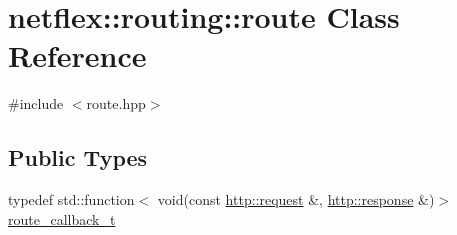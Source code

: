 \hypertarget{classnetflex_1_1routing_1_1route}{}\section{netflex\+:\+:routing\+:\+:route Class Reference}
\label{classnetflex_1_1routing_1_1route}


{\ttfamily \#include $<$route.\+hpp$>$}

\subsection*{Public Types}
\begin{DoxyCompactItemize}
\item 
typedef std\+::function$<$ void(const \hyperlink{classnetflex_1_1http_1_1request}{http\+::request} \&, \hyperlink{classnetflex_1_1http_1_1response}{http\+::response} \&)$>$ \hyperlink{classnetflex_1_1routing_1_1route_a5af1479be27de20f7c395bf2fb0f3639}{route\+\_\+callback\+\_\+t}
\end{DoxyCompactItemize}
